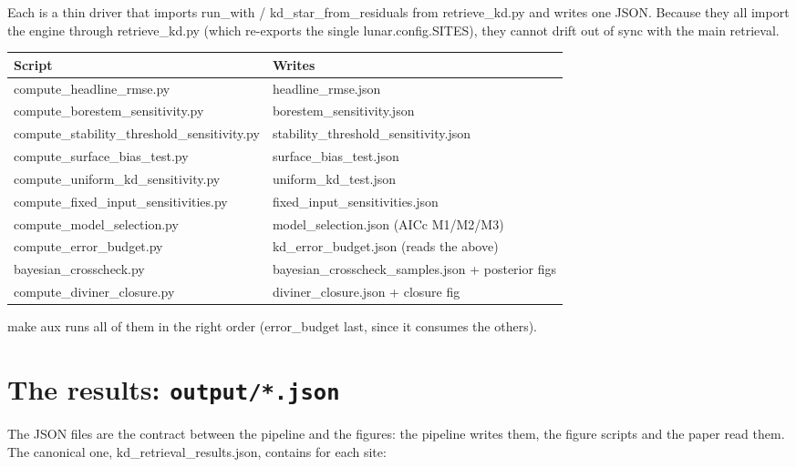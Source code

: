 \documentclass[11pt]{report}
\newcommand{\code}[1]{{\ttfamily\small #1}}
\newcommand{\file}[1]{\textcolor{forest}{\ttfamily #1}}
\begin{document}
Each is a thin driver that imports \code{run\_with} /
\code{kd\_star\_from\_residuals} from \file{retrieve\_kd.py} and writes one
JSON. Because they all import the engine through \file{retrieve\_kd.py}
(which re-exports the single \code{lunar.config.SITES}), they cannot drift
out of sync with the main retrieval.

\begin{center}\small
\begin{tabular}{@{}ll@{}}
\toprule
Script & Writes \\
\midrule
\code{compute\_headline\_rmse.py} & \code{headline\_rmse.json} \\
\code{compute\_borestem\_sensitivity.py} & \code{borestem\_sensitivity.json} \\
\code{compute\_stability\_threshold\_sensitivity.py} & \code{stability\_threshold\_sensitivity.json} \\
\code{compute\_surface\_bias\_test.py} & \code{surface\_bias\_test.json} \\
\code{compute\_uniform\_kd\_sensitivity.py} & \code{uniform\_kd\_test.json} \\
\code{compute\_fixed\_input\_sensitivities.py} & \code{fixed\_input\_sensitivities.json} \\
\code{compute\_model\_selection.py} & \code{model\_selection.json} (AICc M1/M2/M3) \\
\code{compute\_error\_budget.py} & \code{kd\_error\_budget.json} (reads the above) \\
\code{bayesian\_crosscheck.py} & \code{bayesian\_crosscheck\_samples.json} + posterior figs \\
\code{compute\_diviner\_closure.py} & \code{diviner\_closure.json} + closure fig \\
\bottomrule
\end{tabular}
\end{center}

\code{make aux} runs all of them in the right order (\code{error\_budget}
last, since it consumes the others).

\chapter{The results: \texttt{output/*.json}}

The JSON files are the contract between the pipeline and the figures: the
pipeline writes them, the figure scripts and the paper read them. The
canonical one, \file{kd\_retrieval\_results.json}, contains for each site:
\end{document}
